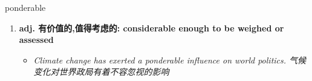 
\begin{frame}
{\huge ponderable}
\begin{center}
\begin{enumerate}\Large
  \item \textbf{adj. 有价值的,值得考虑的: considerable enough to be weighed or assessed}
  \begin{itemize}
    \item \em{\Large{Climate change has exerted a ponderable influence on world politics. 气候变化对世界政局有着不容忽视的影响}}
  \end{itemize}
\end{enumerate}
\end{center}
\end{frame}
